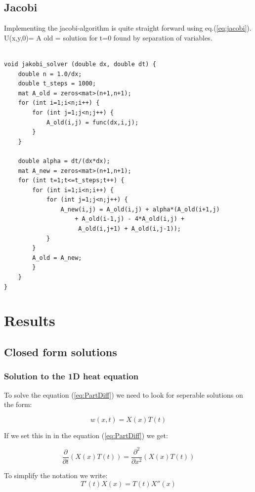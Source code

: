 \documentclass[a4paper,10pt]{article}
\begin{document}
\subsection{Jacobi}
Implementing the jacobi-algorithm is quite straight forward using eq.(\ref{eq:jacobi}). U(x,y,0)= A old = solution for t=0 found by separation of variables.
\begin{verbatim}

void jakobi_solver (double dx, double dt) {
    double n = 1.0/dx;
    double t_steps = 1000;
    mat A_old = zeros<mat>(n+1,n+1);
    for (int i=1;i<n;i++) {
        for (int j=1;j<n;j++) {
            A_old(i,j) = func(dx,i,j);
        }
    }

    double alpha = dt/(dx*dx);
    mat A_new = zeros<mat>(n+1,n+1);
    for (int t=1;t<=t_steps;t++) {
        for (int i=1;i<n;i++) {
            for (int j=1;j<n;j++) {
                A_new(i,j) = A_old(i,j) + alpha*(A_old(i+1,j)
                    + A_old(i-1,j) - 4*A_old(i,j) +
                     A_old(i,j+1) + A_old(i,j-1));
            }
        }
        A_old = A_new;
        }
    }
} 
\end{verbatim}


\section{Results}
\subsection{Closed form solutions}
\subsubsection{Solution to the 1D heat equation}
To solve the equation (\ref{eq:PartDiff}) we need to look for seperable solutions on the form:

\begin{equation}
 w(x,t) = X(x)T(t)
 \label{eq:u_xt}
\end{equation}

If we set this in in the equation (\ref{eq:PartDiff}) we get:

\begin{equation}
  \frac{\partial }{\partial t}(X(x)T(t)) = \frac{\partial ^2}{\partial x^2}(X(x)T(t))
\end{equation}

To simplify the notation we write:
\begin{equation}
 T'(t)X(x) = T(t)X''(x)
\end{equation}
\end{document}
